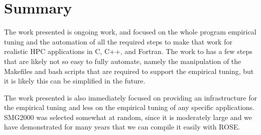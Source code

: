 \section{Summary}

   The work presented is ongoing work, and focused on the whole program empirical tuning
and the automation of all the required steps to make that work for realistic HPC applications
in C, C++, and Fortran.  
The work to has a few steps that are likely not so easy to fully
automate, namely the manipulation of the Makefiles and bash scripts that are required to support the empirical
tuning, but it is likely this can be simplified in the future.

The work presented is also immediately focused on providing an infrastructure for 
the empirical tuning and less on the empirical tuning of any specific applications.
SMG2000 was selected somewhat at random, since it is moderately large and 
we have demonstrated for many years that we can compile it easily with ROSE.

